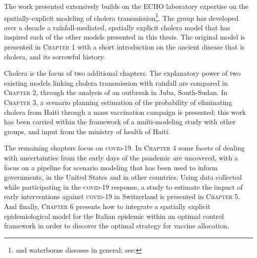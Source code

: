 The work presented extensively builds on the ECHO laboratory expertise on the spatially-explicit modeling of cholera transmission\footnote[][2\baselineskip]{and waterborne diseases in general; see: }. The group has developed over a decade a rainfall-mediated, spatially explicit cholera model that has inspired each of the other models presented in this thesis. The original model is presented in \textsc{Chapter 1} with a short introduction on the ancient disease that is cholera, and its sorrowful history.

Cholera is the focus of two additional chapters. The explanatory power of two existing models linking cholera transmission with rainfall are compared in \textsc{Chapter 2}, through the analysis of an outbreak in Juba, South-Sudan. In \textsc{Chapter 3}, a scenario planning estimation of the probability of eliminating cholera from Haiti through a mass vaccination campaign is presented; this work has been carried within the framework of a multi-modeling study with other groups, and input from the ministry of health of Haiti.

The remaining chapters focus on \textsc{covid}-19. In \textsc{Chapter 4} some facets of dealing with uncertainties from the early days of the pandemic are uncovered, with a focus on a pipeline for scenario modeling that has been used to inform governments, in the United States and in other countries. 
Using data collected while participating in the \textsc{covid}-19 response, a study to estimate the impact of early interventions against \textsc{covid}-19 in Switzerland is presented in \textsc{Chapter 5}.
And finally, \textsc{Chapter 6} presents how to integrate a spatially explicit epidemiological model for the Italian epidemic within an optimal control framework in order to discover the optimal strategy for vaccine allocation.




